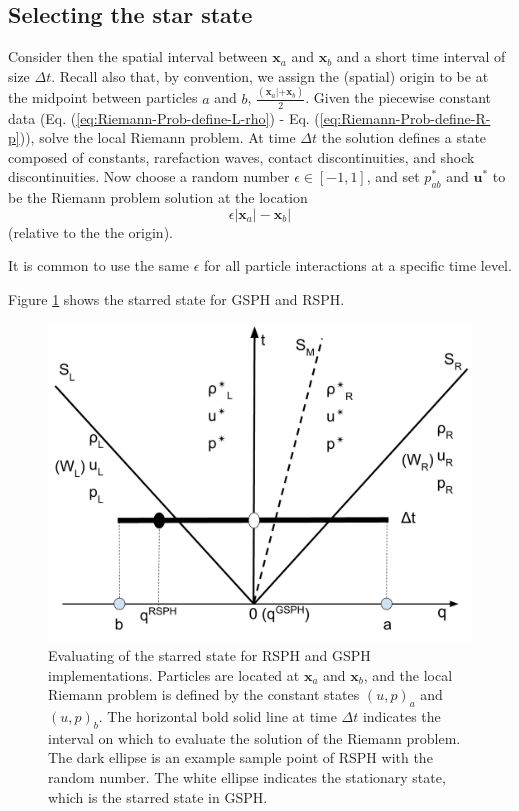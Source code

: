 \documentclass[review]{elsarticle}
\begin{document}
\subsection{Selecting the star state} \label{sec:Picking-up-single-state}
Consider then the spatial interval between $\textbf{x}_{a}$ and $\textbf{x}_{ b}$ and a short time interval
of size $\Delta t$. Recall also that, by convention, we assign the (spatial) origin to
be at the midpoint between particles $a$ and $b$, 
$\frac{(\textbf{x}_{a}| + \textbf{x}_{ b})}{2}$.
Given the piecewise constant
 data (Eq. (\ref{eq:Riemann-Prob-define-L-rho}) - Eq. (\ref{eq:Riemann-Prob-define-R-p})), solve the local Riemann problem. 
 At time $\Delta t$ the solution defines a state composed of constants,
rarefaction waves, contact discontinuities, and shock discontinuities. 
Now choose a random number $\epsilon \in [-1,1]$, and set 
$p_{a b}^{\ast}$ and $\textbf{u}^{\ast}$ to be the Riemann problem solution
at the location 
$$
\epsilon |\textbf{x}_{a}| - \textbf{x}_{ b}|
$$
(relative to the the origin).

It is common to use the same $\epsilon$ for all particle interactions at a specific time level.

Figure \ref{fig:pick-up-state-GSPH-RSPH} shows the starred state for GSPH and RSPH.
\begin{figure}[H]
    \center
	\includegraphics[width=0.5 \textwidth]{./Figures/RSPH-GSPH}
    \caption{Evaluating of the starred state for  RSPH and GSPH implementations.
Particles are located at $\textbf{x}_{a} $ and $ \textbf{x}_{ b}$, and the local Riemann problem is defined by the constant states $(u, p)_a$ and $(u,p)_b$.
  The horizontal bold solid line at time $\Delta t$ indicates the interval on which to
  evaluate the solution of the Riemann problem.
  The dark ellipse is an example sample point of RSPH with the random number. The white ellipse indicates the stationary state, which is the starred state in GSPH.  }
    \label{fig:pick-up-state-GSPH-RSPH}
\end{figure}
\end{document}
